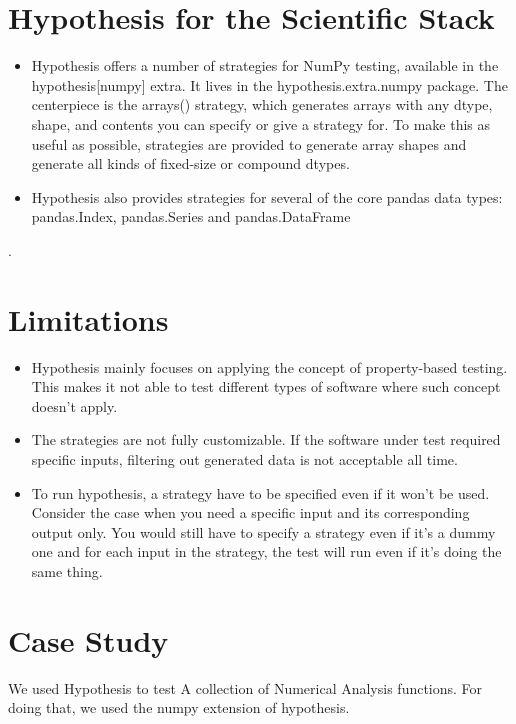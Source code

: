 \documentclass[12pt]{article}
\begin{document}
{\section{{\large Hypothesis for the Scientific Stack}}
\begin{itemize}
	\item Hypothesis offers a number of strategies for NumPy testing, available in the hypothesis[numpy] extra. It lives in the hypothesis.extra.numpy package. The centerpiece is the arrays() strategy, which generates arrays with any dtype, shape, and contents you can specify or give a strategy for. To make this as useful as possible, strategies are provided to generate array shapes and generate all kinds of fixed-size or compound dtypes.
	\item Hypothesis also provides strategies for several of the core pandas data types: pandas.Index, pandas.Series and pandas.DataFrame 
\end{itemize}.
\section{{\large Limitations}}
\begin{itemize}
	\item Hypothesis mainly focuses on applying the concept of property-based testing. This makes it not able to test different types of software where such concept doesn't apply.
	\item The strategies are not fully customizable. If the software under test required specific inputs, filtering out generated data is not acceptable all time.
	\item To run hypothesis, a strategy have to be specified even if it won't be used. Consider the case when you need a specific input and its corresponding output only. You would still have to specify a strategy even if it's a dummy one and for each input in the strategy, the test will run even if it's doing the same thing.
\end{itemize}
\section{{\large Case Study}}
We used Hypothesis to test A collection of Numerical Analysis functions. For doing that, we used the numpy extension of hypothesis.
}
\end{document}
